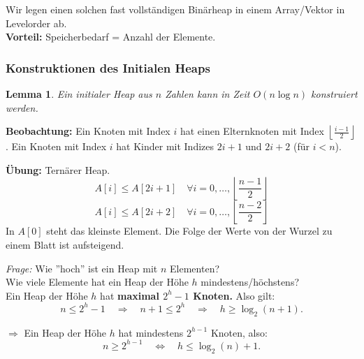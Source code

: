 \documentclass{article}
\newtheorem{lem}[thm]{Lemma}
\begin{document}
Wir legen einen solchen fast vollständigen Binärheap in einem Array/Vektor in Levelorder ab. \\

\textbf{Vorteil:} Speicherbedarf = Anzahl der Elemente.\\
\subsubsection{Konstruktionen des Initialen Heaps}

\begin{lem}
Ein initialer Heap aus $n$ Zahlen kann in Zeit $O(n\log n)$
konstruiert werden.
\end{lem}
\textbf{Beobachtung:} Ein Knoten mit Index \(i\) hat einen Elternknoten mit Index \(\left\lfloor \frac{i - 1}{2} \right\rfloor\). Ein Knoten mit Index \(i\) hat Kinder mit Indizes \(2i + 1\) und \(2i + 2\) (für \(i < n\)).

\textbf{Übung:} Ternärer Heap. \[A[i] \leq A[2i + 1] \quad \forall i = 0, \dots, \left\lfloor \frac{n - 1}{2} \right\rfloor\]
\[A[i] \leq A[2i + 2] \quad \forall i = 0, \dots, \left\lfloor \frac{n - 2}{2} \right\rfloor\]
In \(A[0]\) steht das kleinste Element. Die Folge der Werte von der Wurzel zu einem Blatt ist aufsteigend.

\textit{Frage:} Wie ''hoch'' ist ein Heap mit \(n\) Elementen? \\Wie viele Elemente hat ein Heap der Höhe \(h\) mindestens/höchstens?\\

Ein Heap der Höhe \(h\) hat \textbf{maximal \(2^h - 1\) Knoten.} Also gilt:
\[
n \leq 2^h - 1 \quad \Rightarrow \quad n + 1 \leq 2^h \quad \Rightarrow \quad h \geq \log_2(n + 1).
\]

\(\Rightarrow\) Ein Heap der Höhe \(h\) hat mindestens \(2^{h-1}\) Knoten, also:
\[
n \geq 2^{h-1} \quad \Leftrightarrow \quad h \leq \log_2(n) + 1.
\]
\end{document}
